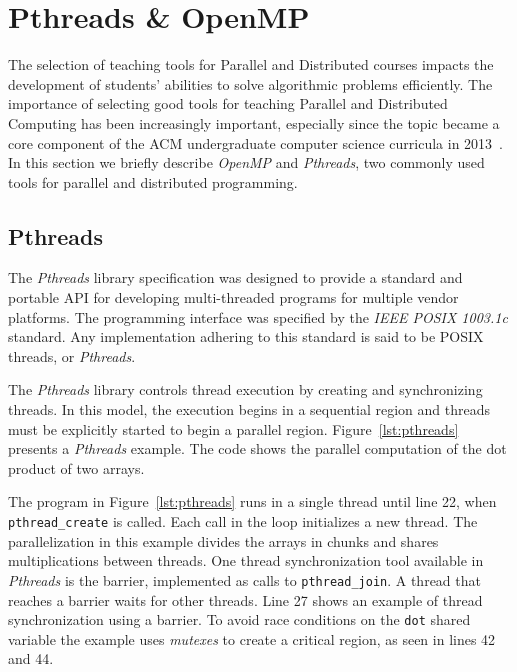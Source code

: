 \section{Pthreads \& OpenMP}
\label{sec:apis}

The selection of teaching tools for Parallel and Distributed courses impacts
the development of students' abilities to solve algorithmic problems
efficiently. The importance of selecting good tools for teaching Parallel and
Distributed Computing has been increasingly important, especially since the
topic became a core component of the ACM undergraduate computer science
curricula in 2013~\cite{acmcurricula}.  In this section we briefly describe
\textit{OpenMP} and \textit{Pthreads}, two commonly used tools for parallel and
distributed programming.

\subsection{Pthreads}

The \textit{Pthreads} library specification was designed to provide a standard
and portable API for developing multi-threaded programs for multiple vendor
platforms.  The programming interface was specified by the \textit{IEEE POSIX
1003.1c} standard. Any implementation adhering to this standard is said to be
POSIX threads, or \textit{Pthreads}.

The \textit{Pthreads} library controls thread execution by
creating and synchronizing threads. In this model, the execution begins in a
sequential region and threads must be explicitly started to begin a parallel
region.  Figure~\ref{lst:pthreads} presents a \textit{Pthreads}
example. The code shows the parallel computation of the dot product of two
arrays.

The program in Figure~\ref{lst:pthreads} runs in a single thread until
line 22, when \texttt{pthread\_create} is called.  Each call
in the loop initializes a new thread.
The parallelization in this example divides the arrays in chunks
and shares multiplications between threads.
One thread synchronization tool available in \textit{Pthreads} is the barrier,
implemented as calls to \texttt{pthread\_join}. A thread that reaches a barrier
waits for other threads. Line 27 shows an example of thread synchronization
using a barrier.
To avoid race conditions on the \texttt{dot} shared variable
the example uses \textit{mutexes} to create a critical
region, as seen in lines 42 and 44.

